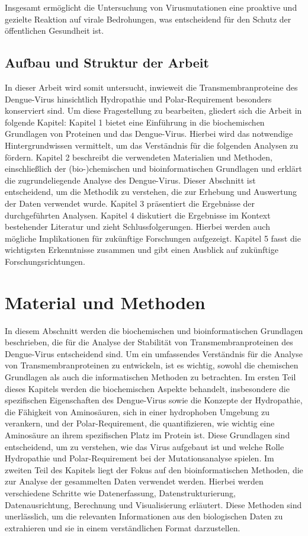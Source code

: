 \documentclass[german,version-2022-01]{uzl-thesis}
\begin{document}
Insgesamt erm\"oglicht die Untersuchung von Virusmutationen eine proaktive und gezielte Reaktion auf virale Bedrohungen, was entscheidend f\"ur den Schutz der \"offentlichen Gesundheit ist.

\section{Aufbau und Struktur der Arbeit}
In dieser Arbeit wird somit untersucht, inwieweit die Transmembranproteine des Dengue-Virus hinsichtlich Hydropathie und Polar-Requirement besonders konserviert sind. Um diese Fragestellung zu bearbeiten, gliedert sich die Arbeit in folgende Kapitel: Kapitel 1 bietet eine Einf\"uhrung in die biochemischen Grundlagen von Proteinen und das Dengue-Virus. Hierbei wird das notwendige Hintergrundwissen vermittelt, um das Verst\"andnis f\"ur die folgenden Analysen zu f\"ordern. Kapitel 2 beschreibt die verwendeten Materialien und Methoden, einschlie\ss{}lich der (bio-)chemischen und bioinformatischen Grundlagen und erkl\"art die zugrundeliegende Analyse des Dengue-Virus. Dieser Abschnitt ist entscheidend, um die Methodik zu verstehen, die zur Erhebung und Auswertung der Daten verwendet wurde. Kapitel 3 pr\"asentiert die Ergebnisse der durchgef\"uhrten Analysen. Kapitel 4 diskutiert die Ergebnisse im Kontext bestehender Literatur und zieht Schlussfolgerungen. Hierbei werden auch m\"ogliche Implikationen f\"ur zuk\"unftige Forschungen aufgezeigt. Kapitel 5 fasst die wichtigsten Erkenntnisse zusammen und gibt einen Ausblick auf zuk\"unftige Forschungsrichtungen.

\chapter{Material und Methoden}%
\label{chapter-use}
In diesem Abschnitt werden die biochemischen und bioinformatischen Grundlagen beschrieben, die f\"ur die Analyse der Stabilit\"at von Transmembranproteinen des Dengue-Virus entscheidend sind. Um ein umfassendes Verst\"andnis f\"ur die Analyse von Transmembranproteinen zu entwickeln, ist es wichtig, sowohl die chemischen Grundlagen als auch die informatischen Methoden zu betrachten. Im ersten Teil dieses Kapitels werden die biochemischen Aspekte behandelt, insbesondere die spezifischen Eigenschaften des Dengue-Virus sowie die Konzepte der Hydropathie, die F\"ahigkeit von Aminos\"auren, sich in einer hydrophoben Umgebung zu verankern, und der Polar-Requirement, die quantifizieren, wie wichtig eine Aminos\"aure an ihrem spezifischen Platz im Protein ist. Diese Grundlagen sind entscheidend, um zu verstehen, wie das Virus aufgebaut ist und welche Rolle Hydropathie und Polar-Requirement bei der Mutationsanalyse spielen. Im zweiten Teil des Kapitels liegt der Fokus auf den bioinformatischen Methoden, die zur Analyse der gesammelten Daten verwendet werden. Hierbei werden verschiedene Schritte wie Datenerfassung, Datenstrukturierung, Datenausrichtung, Berechnung und Visualisierung erl\"autert. Diese Methoden sind unerl\"asslich, um die relevanten Informationen aus den biologischen Daten zu extrahieren und sie in einem verst\"andlichen Format darzustellen. 
\end{document}
